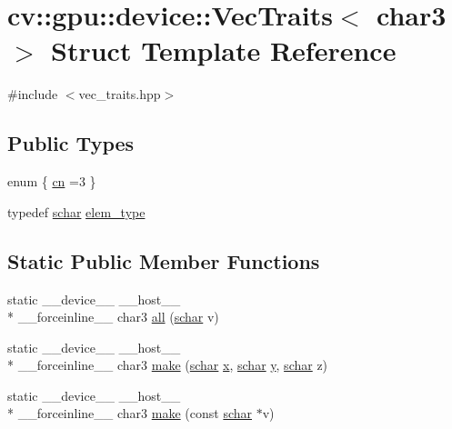 \hypertarget{structcv_1_1gpu_1_1device_1_1VecTraits_3_01char3_01_4}{\section{cv\-:\-:gpu\-:\-:device\-:\-:Vec\-Traits$<$ char3 $>$ Struct Template Reference}
\label{structcv_1_1gpu_1_1device_1_1VecTraits_3_01char3_01_4}
}


{\ttfamily \#include $<$vec\-\_\-traits.\-hpp$>$}

\subsection*{Public Types}
\begin{DoxyCompactItemize}
\item 
enum \{ \hyperlink{structcv_1_1gpu_1_1device_1_1VecTraits_3_01char3_01_4_af956863fea74497c034a8b44019676dea91cbf7ea679651b3c40f969919af5dd3}{cn} =3
 \}
\item 
typedef \hyperlink{core_2types__c_8h_a0fd9ce9d735064461bebfe6037026093}{schar} \hyperlink{structcv_1_1gpu_1_1device_1_1VecTraits_3_01char3_01_4_a017c0932607a35358a9cac4e2aeff577}{elem\-\_\-type}
\end{DoxyCompactItemize}
\subsection*{Static Public Member Functions}
\begin{DoxyCompactItemize}
\item 
static \-\_\-\-\_\-device\-\_\-\-\_\- \-\_\-\-\_\-host\-\_\-\-\_\- \\*
\-\_\-\-\_\-forceinline\-\_\-\-\_\- char3 \hyperlink{structcv_1_1gpu_1_1device_1_1VecTraits_3_01char3_01_4_a8ac61ef4d12c831e6d71dd5d3192e911}{all} (\hyperlink{core_2types__c_8h_a0fd9ce9d735064461bebfe6037026093}{schar} v)
\item 
static \-\_\-\-\_\-device\-\_\-\-\_\- \-\_\-\-\_\-host\-\_\-\-\_\- \\*
\-\_\-\-\_\-forceinline\-\_\-\-\_\- char3 \hyperlink{structcv_1_1gpu_1_1device_1_1VecTraits_3_01char3_01_4_a9f05d947283c27deb2a1ffd27a15945b}{make} (\hyperlink{core_2types__c_8h_a0fd9ce9d735064461bebfe6037026093}{schar} \hyperlink{highgui__c_8h_a6150e0515f7202e2fb518f7206ed97dc}{x}, \hyperlink{core_2types__c_8h_a0fd9ce9d735064461bebfe6037026093}{schar} \hyperlink{highgui__c_8h_af1202c02b14870c18fb3a1da73e9e7c7}{y}, \hyperlink{core_2types__c_8h_a0fd9ce9d735064461bebfe6037026093}{schar} z)
\item 
static \-\_\-\-\_\-device\-\_\-\-\_\- \-\_\-\-\_\-host\-\_\-\-\_\- \\*
\-\_\-\-\_\-forceinline\-\_\-\-\_\- char3 \hyperlink{structcv_1_1gpu_1_1device_1_1VecTraits_3_01char3_01_4_a5d4266fdd29d50fe828f9444c43eb8d4}{make} (const \hyperlink{core_2types__c_8h_a0fd9ce9d735064461bebfe6037026093}{schar} $\ast$v)
\end{DoxyCompactItemize}


